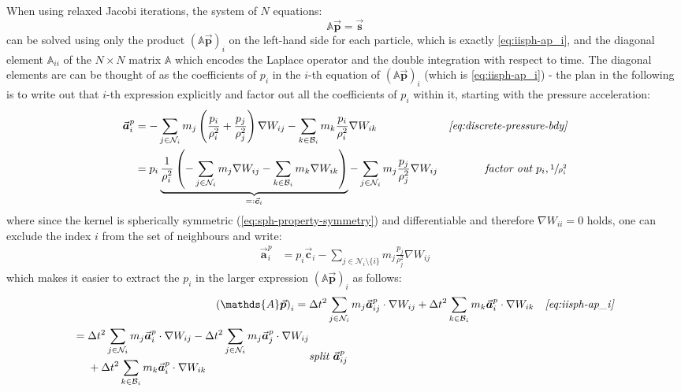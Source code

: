 \documentclass[oneside, a4paper]{book}
\newcommand\vek[1]{\vec{\bm{#1}}}
\newcommand\br[1]{\left(#1\right)}
\begin{document}
    When using relaxed Jacobi iterations, the system of $N$ equations:
    \begin{equation}
      \mathds{A}\vek{p} = \vek{s}
    \end{equation}
    can be solved using only the product $\br{\mathds{A}\vek{p}}_i$ on the left-hand side for each particle, which is exactly \autoref{eq:iisph-ap_i}, and the diagonal element $\mathds{A}_{ii}$ of the $N\times N$ matrix $\mathds{A}$ which encodes the Laplace operator and the double integration with respect to time. The diagonal elements are can be thought of as the coefficients of $p_i$ in the $i$-th equation of $\br{\mathds{A}\vek{p}}_i$ (which is \autoref{eq:iisph-ap_i}) - the plan in the following is to write out that $i$-th expression explicitly and factor out all the coefficients of $p_i$ within it, starting with the pressure acceleration:
    \begin{align}
      \vek{a}_i^p &= -
      \sum_{j\in\mathcal{N}_i} 
        m_j \br{\frac{p_i}{\rho_i^2} + \frac{p_j}{\rho_j^2}} \nabla W_{ij} 
      -\sum_{k\in\mathcal{B}_i} 
        m_k\frac{p_i}{\rho_i^2} \nabla W_{ik} 
      &\textit{\autoref{eq:discrete-pressure-bdy}}\\
      &= p_i \underbrace{\frac{1}{\rho_i^2}\br{
        -\sum_{j\in\mathcal{N}_i} 
        m_j \nabla W_{ij} 
        -\sum_{k\in\mathcal{B}_i} 
        m_k \nabla W_{ik} 
      }}_{=: \vek{c}_i}
      - \sum_{j\in\mathcal{N}_i} 
        m_j\frac{p_j}{\rho_j^2} \nabla W_{ij} 
      &\textit{factor out $p_i, \sfrac{1}{\rho_i^2}$}
    \end{align}
    where since the kernel is spherically symmetric (\autoref{eq:sph-property-symmetry}) and differentiable and therefore $\nabla W_{ii}=0$ holds, one can exclude the index $i$ from the set of neighbours and write:
    \begin{align}
      \vek{a}_i^p &= p_i \vek{c}_i - 
      \sum_{j\in\mathcal{N}_i\setminus\{i\}} 
        m_j\frac{p_j}{\rho_j^2} \nabla W_{ij} \label{eq:iisph-a-p-c_i}
    \end{align}
    which makes it easier to extract the $p_i$ in the larger expression $\br{\mathds{A}\vek{p}}_{i}$ as follows:
    \begin{align}
      \br{\mathds{A}\vek{p}}_{i}
      ={}&\Delta t^2 \sum_{j\in\mathcal{N}_i} m_j \vek{a}^p_{ij} \cdot \nabla W_{ij}
      +\Delta t^2 \sum_{k\in\mathcal{B}_i} m_k \vek{a}^p_{i} \cdot \nabla W_{ik} 
      &\textit{\autoref{eq:iisph-ap_i}}\\
      \begin{split}
        ={}&\Delta t^2 \sum_{j\in\mathcal{N}_i} m_j \vek{a}^p_{i} \cdot \nabla W_{ij}
        -\Delta t^2 \sum_{j\in\mathcal{N}_i} m_j \vek{a}^p_{j} \cdot \nabla W_{ij}\\
        &+\Delta t^2 \sum_{k\in\mathcal{B}_i} m_k \vek{a}^p_{i} \cdot \nabla W_{ik}
      \end{split}
      &\textit{split $\vek{a}^p_{ij}$}
    \end{align}
\end{document}
